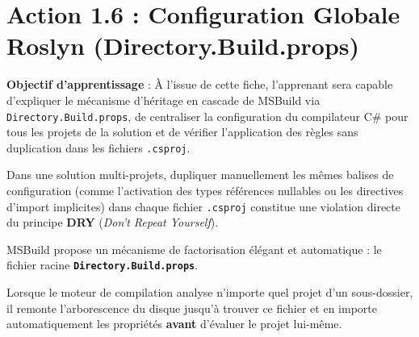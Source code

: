 \section{Action 1.6 : Configuration Globale Roslyn (Directory.Build.props)}

\begin{tcolorbox}[colback=indigo!4!white,colframe=indigo!40!white,arc=2mm,boxrule=0.8pt,top=2mm,bottom=2mm,left=3mm,right=3mm]
    \small\textbf{\color{indigo!90!black}Objectif d'apprentissage} : À l'issue de cette fiche, l'apprenant sera capable d'expliquer le mécanisme d'héritage en cascade de MSBuild via \texttt{Directory.Build.props}, de centraliser la configuration du compilateur C\# pour tous les projets de la solution et de vérifier l'application des règles sans duplication dans les fichiers \texttt{.csproj}.
\end{tcolorbox}

\vspace{0.1cm}

Dans une solution multi-projets, dupliquer manuellement les mêmes balises de configuration (comme l'activation des types références nullables ou les directives d'import implicites) dans chaque fichier \texttt{.csproj} constitue une violation directe du principe \textbf{DRY} (\textit{Don't Repeat Yourself}).

MSBuild propose un mécanisme de factorisation élégant et automatique : le fichier racine \textbf{\texttt{Directory.Build.props}}.

Lorsque le moteur de compilation analyse n'importe quel projet d'un sous-dossier, il remonte l'arborescence du disque jusqu'à trouver ce fichier et en importe automatiquement les propriétés \textbf{avant} d'évaluer le projet lui-même.

\vspace{0.3cm}


